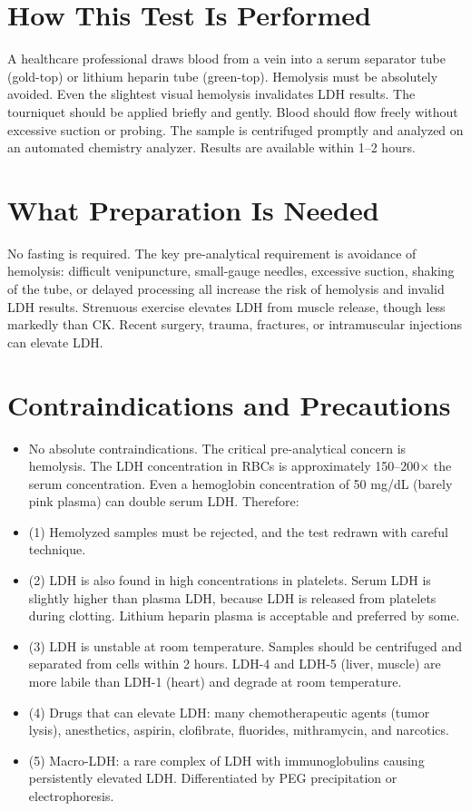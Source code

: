 \section*{How This Test Is Performed}
A healthcare professional draws blood from a vein into a serum separator tube (gold-top) or lithium heparin tube (green-top). Hemolysis must be absolutely avoided. Even the slightest visual hemolysis invalidates LDH results. The tourniquet should be applied briefly and gently. Blood should flow freely without excessive suction or probing. The sample is centrifuged promptly and analyzed on an automated chemistry analyzer. Results are available within 1--2 hours.

\section*{What Preparation Is Needed}
No fasting is required. The key pre-analytical requirement is avoidance of hemolysis: difficult venipuncture, small-gauge needles, excessive suction, shaking of the tube, or delayed processing all increase the risk of hemolysis and invalid LDH results. Strenuous exercise elevates LDH from muscle release, though less markedly than CK. Recent surgery, trauma, fractures, or intramuscular injections can elevate LDH.

\section*{Contraindications and Precautions}
\begin{itemize}
  \item No absolute contraindications. The critical pre-analytical concern is hemolysis. The LDH concentration in RBCs is approximately 150--200$\times$ the serum concentration. Even a hemoglobin concentration of 50 mg/dL (barely pink plasma) can double serum LDH. Therefore:
  \item (1) Hemolyzed samples must be rejected, and the test redrawn with careful technique.
  \item (2) LDH is also found in high concentrations in platelets. Serum LDH is slightly higher than plasma LDH, because LDH is released from platelets during clotting. Lithium heparin plasma is acceptable and preferred by some.
  \item (3) LDH is unstable at room temperature. Samples should be centrifuged and separated from cells within 2 hours. LDH-4 and LDH-5 (liver, muscle) are more labile than LDH-1 (heart) and degrade at room temperature.
  \item (4) Drugs that can elevate LDH: many chemotherapeutic agents (tumor lysis), anesthetics, aspirin, clofibrate, fluorides, mithramycin, and narcotics.
  \item (5) Macro-LDH: a rare complex of LDH with immunoglobulins causing persistently elevated LDH. Differentiated by PEG precipitation or electrophoresis.
\end{itemize}
